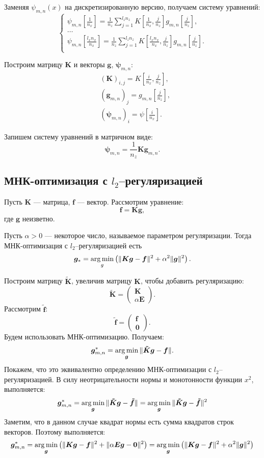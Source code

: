\documentclass[../paper.tex]{subfiles}
\begin{document}
Заменяя $\psi_{m,n}(x)$ на дискретизированную версию, получаем систему уравнений:
\[
	\begin{cases}
		\psi_{m,n}\left[ \frac{1}{n_x} \right]
		= \frac{1}{n_z} \sum_{j=1}^{l_z n_z} K\left[\frac{1}{n_x}, \frac{j}{n_z}\right] g_{m,n}\left[\frac{j}{n_z}\right],\\
		\dots\\
		\psi_{m,n}\left[ \frac{l_x n_x}{n_x} \right]
		= \frac{1}{n_z} \sum_{j=1}^{l_z n_z} K\left[\frac{l_x n_x}{n_x}, \frac{j}{n_z}\right] g_{m,n}\left[\frac{j}{n_z}\right].\\
	\end{cases}
\]

Построим матрицу $\bm{K}$ и векторы $\bm{g}$, $\bm{\psi}_{m,n}$:
\begin{align*}
	&\left(\bm{K}\right)_{i,j}    = K\left[\frac{i}{n_x}, \frac{j}{n_z}\right],\\
	&\left(\bm{g}_{m,n}\right)_j      = g_{m,n}\left[\frac{j}{n_z}\right],\\
	&\left(\bm{\psi}_{m,n}\right)_i = \psi\left[\frac{i}{n_x}\right].
\end{align*}

Запишем систему уравнений в матричном виде:
\[
	\bm{\psi}_{m,n} = \frac{1}{n_z} \bm{K} \bm{g}_{m,n}
.\]

\subsection{МНК-оптимизация с $l_2$--регуляризацией}
\begin{Def}
	Пусть $\bm{K}$ --- матрица, $\bm{f}$ --- вектор.
	Рассмотрим уравнение:
	\[
		\bm{f} = \bm{K}\bm{g}
	,\] где $\bm{g}$ неизветно.

	Пусть $\alpha > 0$ --- некоторое число, называемое параметром регуляризации.
	Тогда МНК-оптимизация с $l_2$--регуляризацией есть
	\[
		\bm{g}_{*} = \operatorname*{arg\,min}_g \left( \| \bm{K}\bm{g} - \bm{f} \|^2 + \alpha^2 \|\bm{g}\|^2 \right)
	.\]
\end{Def}
Построим матрицу $\bm{\tilde K}$, увеличив матрицу $\bm{K}$, чтобы добавить регуляризацию:
\[
	\bm{\tilde K} = 
	\begin{pmatrix}
	    \bm{K} \\
	    \alpha \bm{E}
	\end{pmatrix}
.\]
Рассмотрим $\bm{\tilde f}$:
\[
	\bm{\tilde f} = 
	\begin{pmatrix}
	    \bm{f} \\
	    \bm{0}
	\end{pmatrix}
.\]
Будем использовать МНК-оптимизацию. Получаем:
\[
	\bm{g}_{m,n}^* = \operatorname*{arg\,min}_{\bm{g}} \| \bm{\tilde K} \bm{g} - \bm{f} \|
.\]
Покажем, что это эквивалентно определению МНК-оптимизации с $l_2$--регуляризацией.
В силу неотрицательности нормы и монотонности функции $x^2$, выполняется:
\[
	\bm{g}_{m,n}^* = \operatorname*{arg\,min}_{\bm{g}} \| \bm{\tilde K} \bm{g} - \bm{\tilde f} \|
	= \operatorname*{arg\,min}_{\bm{g}} \| \bm{\tilde K} \bm{g} - \bm{\tilde f} \|^2
\]
Заметим, что в данном случае квадрат нормы есть сумма квадратов строк векторов. Поэтому выполняется:
\[
	\bm{g}_{m,n}^* 
	= \operatorname*{arg\,min}_{\bm{g}} \left(\| \bm{K} \bm{g} - \bm{f} \|^2 + \| \alpha \bm{E} \bm{g} - \bm{0} \|^2\right)
	= \operatorname*{arg\,min}_{\bm{g}} \left(\| \bm{K} \bm{g} - \bm{f} \|^2 + \alpha^2 \| \bm{g} \|^2\right)
\]
%
\end{document}
